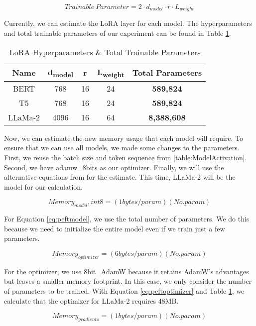 \[ Trainable \ Parameter = 2 \cdot d_{model} \cdot r \cdot L_{weight} \label{eq:TrainParam} \tag{6} \] 

Currently, we can estimate the LoRA layer for each model. The hyperparameters and total trainable parameters of our experiment can be found in Table \ref{table:LoRA}.

\begin{table}[H]
	\centering
	\caption{LoRA Hyperparameters \& Total Trainable Parameters}
	\begin{tabular}{||c | c | c | c | c||} 
		\hline
		\textbf{Name} & \textbf{d\textsubscript{model}} & \textbf{r} & \textbf{L\textsubscript{weight}} & \textbf{Total Parameters} \\ [1ex] 
		\hline
		BERT & 768 & 16 & 24 & \textbf{589,824} \\ [1ex]
		\hline
		T5 & 768 & 16 & 24 & \textbf{589,824}  \\ [1ex]
		\hline
		LLaMa-2 & 4096 & 16 & 64 & \textbf{8,388,608}  \\ [1ex]
		\hline
	\end{tabular}
	\label{table:LoRA}
\end{table}

Now, we can estimate the new memory usage that each model will require. To ensure that we can use all models, we made some changes to the parameters. First, we reuse the batch size and token sequence from \ref{table:ModelActivation}. Second, we have adamw\_8bits as our optimizer. Finally, we will use the alternative equations from \cite{transformer-math-eleutherai} for the estimate. This time, LLaMa-2 will be the model for our calculation.

\[ Memory_{model}, int8 = (1 bytes/param) (No. param) \label{eq:peftmodel} \tag{7} \] 

For Equation \ref{eq:peftmodel}, we use the total number of parameters. We do this because we need to initialize the entire model even if we train just a few parameters.


\[ Memory_{optimizer} = (6 bytes/param) (No. param) \label{eq:peftoptimizer} \tag{8} \] 

For the optimizer, we use 8bit\_AdamW because it retains AdamW's advantages but leaves a smaller memory footprint. In this case, we only consider the number of parameters to be trained. With Equation \ref{eq:peftoptimizer} and Table \ref{table:LoRA}, we calculate that the optimizer for LLaMa-2 requires 48MB.


\[ Memory_{gradients} = (1 bytes/param) (No. param) \label{eq:peftgradients} \tag{9} \] 

